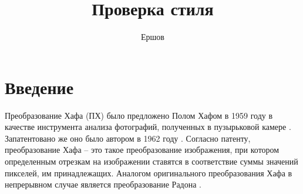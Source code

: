 \documentclass{llncs}
\title{Проверка стиля}
\author{Ершов}
\institute{ИППИ}
\begin{document}
\maketitle
\section{Введение}

Преобразование Хафа (ПХ) было предложено Полом Хафом в 1959 году в качестве инструмента анализа фотографий, полученных в пузырьковой камере \cite{hough1959machine}.
Запатентовано же оно было автором в 1962 году \cite{Hough1962patent}.
Согласно патенту, преобразование Хафа -- это такое преобразование изображения, при котором определенным отрезкам на изображении ставятся в соответствие суммы значений пикселей, им принадлежащих.
Аналогом оригинального преобразования Хафа в непрерывном случае является преобразование Радона \cite{van2004short}.



\end{document}

